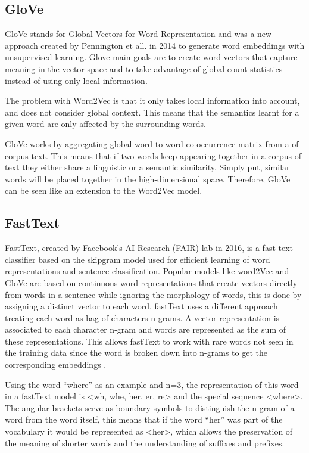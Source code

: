         
        \subsection{GloVe}
            \par GloVe stands for Global Vectors for Word Representation and was a new approach created by Pennington et all. in 2014 \cite{Pennington2014} to generate word embeddings with unsupervised learning. Glove main goals are to create word vectors that capture meaning in the vector space and to take advantage of global count statistics instead of using only local information. 
            \par The problem with Word2Vec is that it only takes local information into account, and does not consider global context. This means that the semantics learnt for a given word are only affected by the surrounding words. 
            \par GloVe works by aggregating global word-to-word co-occurrence matrix from a of corpus text. This means that if two words keep appearing together in a corpus of text they either share a linguistic or a semantic similarity. Simply put, similar words will be placed together in the high-dimensional space. Therefore, GloVe can be seen like an extension to the Word2Vec model.

        \subsection{FastText}

        \par FastText, created by Facebook's AI Research (FAIR) lab in 2016, is a fast text classifier based on the skipgram model  used for efficient learning of word representations and sentence classification. Popular models like word2Vec and GloVe  are based on continuous word representations that create vectors directly from words in a sentence while ignoring the morphology of words, this is done by assigning a distinct vector to each word, fastText uses a different approach treating each word as bag of characters n-grams. A vector representation is associated to each character n-gram and words are represented as the sum of these representations. This allows fastText to work with rare words not seen in the training data since the word is broken down into n-grams to get the corresponding embeddings \cite{bojanowski2016enriching}.


        \par Using the word \enquote{where} as an example and n=3, the representation of this word in a fastText model is <wh, whe, her, er, re> and the special sequence <where>. The angular brackets serve as boundary symbols to distinguish the n-gram of a word from the word itself, this means that if the word \enquote{her} was part of the vocabulary it would be represented as <her>, which allows the preservation of the meaning of shorter words and the understanding of suffixes and prefixes.

